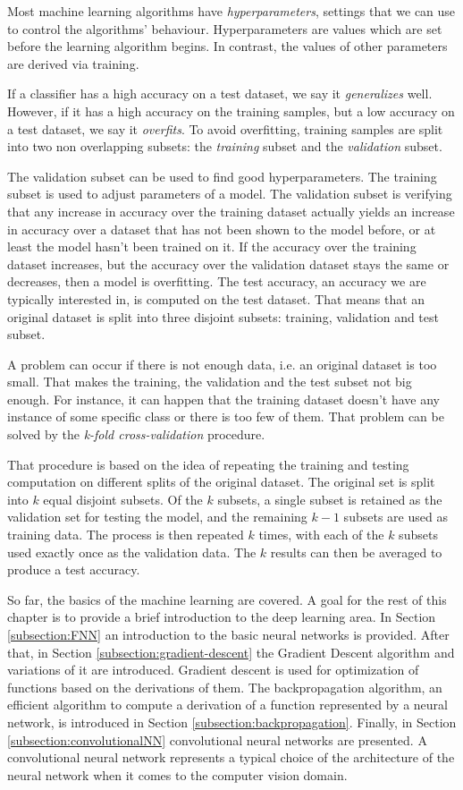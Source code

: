 Most machine learning algorithms have \textit{hyperparameters}, settings that we can use to control the algorithms' behaviour. Hyperparameters are values which are set before the learning algorithm begins. In contrast, the values of other parameters are derived via training. 

If a classifier has a high accuracy on a test dataset, we say it \textit{generalizes} well. However, if it has a high accuracy on the training samples, but a low accuracy on a test dataset, we say it \textit{overfits}. To avoid overfitting, training samples are split into two non overlapping subsets: the \textit{training} subset and the \textit{validation} subset.

The validation subset can be used to find good hyperparameters. The training subset is used to adjust parameters of a model. The validation subset is verifying that any increase in accuracy over the training dataset actually yields an increase in accuracy over a dataset that has not been shown to the model before, or at least the model hasn't been trained on it. If the accuracy over the training dataset increases, but the accuracy over the validation dataset stays the same or decreases, then a model is overfitting. The test accuracy, an accuracy we are typically interested in, is computed on the test dataset. That means that an original dataset is split into three disjoint subsets: training, validation and test subset. 

A problem can occur if there is not enough data, i.e. an original dataset is too small. That makes the training, the validation and the test subset not big enough. For instance, it can happen that the training dataset doesn't have any instance of some specific class or there is too few of them. That problem can be solved by the \textit{k-fold cross-validation} procedure.

That procedure is based on the idea of repeating the training and testing computation on different splits of the original dataset. The original set is split into $k$ equal disjoint subsets. Of the $k$ subsets, a single subset is retained as the validation set for testing the model, and the remaining $k-1$ subsets are used as training data. The process is then repeated $k$ times, with each of the $k$ subsets used exactly once as the validation data. The $k$ results can then be averaged to produce a test accuracy. 

So far, the basics of the machine learning are covered. A goal for the rest of this chapter is to provide a brief introduction to the deep learning area. In Section \ref{subsection:FNN} an introduction to the basic neural networks is provided. After that, in Section \ref{subsection:gradient-descent} the Gradient Descent algorithm and variations of it are introduced. Gradient descent is used for optimization of functions based on the derivations of them. The backpropagation algorithm, an efficient algorithm to compute a derivation of a function represented by a neural network, is introduced in Section \ref{subsection:backpropagation}. Finally, in Section \ref{subsection:convolutionalNN} convolutional neural networks are presented. A convolutional neural network represents a typical choice of the architecture of the neural network when it comes to the computer vision domain.

